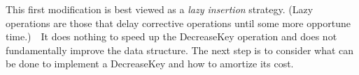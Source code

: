 \documentclass[11pt]{article}
\begin{document}
This first modification is best viewed as a \emph{lazy insertion} strategy.
(Lazy operations are those that delay corrective operations until some more
opportune time.)\ \ It does nothing to speed up the DecreaseKey operation
and does not fundamentally improve the data structure.  The next step
is to consider what can be done to implement a DecreaseKey and how to
amortize its cost.
\end{document}
